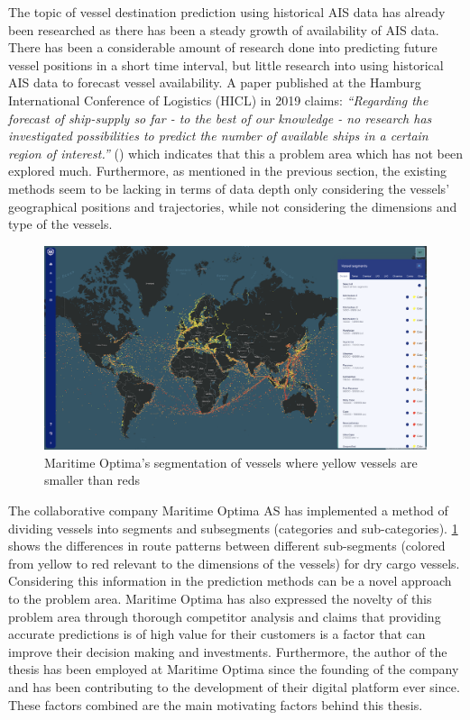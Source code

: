 The topic of vessel destination prediction using historical AIS data has already been researched as there has been a steady growth of availability of AIS data. There has been a considerable amount of research done into predicting future vessel positions in a short time interval, but little research into using historical AIS data to forecast vessel availability. A paper published at the Hamburg International Conference of Logistics (HICL) in 2019 claims: \textit{“Regarding the forecast of ship-supply so far - to the best of our knowledge - no research has investigated possibilities to predict the number of available ships in a certain region of interest.”} (\cite{lechtenberg2019}) which indicates that this a problem area which has not been explored much. Furthermore, as mentioned in the previous section, the existing methods seem to be lacking in terms of data depth only considering the vessels’ geographical positions and trajectories, while not considering the dimensions and type of the vessels.

\begin{figure}[htbp]  %
    \centering
    \includegraphics[width=.89\textwidth]{figures/segment_map}
    \caption{Maritime Optima’s segmentation of vessels where yellow vessels are smaller than reds}
    \label{fig:segment_map}
\end{figure}

The collaborative company Maritime Optima AS has implemented a method of dividing vessels into segments and subsegments (categories and sub-categories). \cref{fig:segment_map} shows the differences in route patterns between different sub-segments (colored from yellow to red relevant to the dimensions of the vessels) for dry cargo vessels. Considering this information in the prediction methods can be a novel approach to the problem area. Maritime Optima has also expressed the novelty of this problem area through thorough competitor analysis and claims that providing accurate predictions is of high value for their customers is a factor that can improve their decision making and investments. Furthermore, the author of the thesis has been employed at Maritime Optima since the founding of the company and has been contributing to the development of their digital platform ever since. These factors combined are the main motivating factors behind this thesis.

